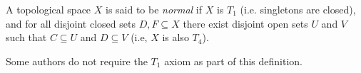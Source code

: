 \documentclass{article}
\begin{document}
A topological space $X$ is said to be \emph{normal} if $X$ is $T_1$ (i.e. singletons are closed), and for all disjoint closed sets $D,F\subseteq X$ there exist disjoint open sets $U$ and $V$ such that $C\subseteq U$ and $D\subseteq V$ (i.e, $X$ is also $T_4$).

Some authors do not require the $T_1$ axiom as part of this definition.
\end{document}
